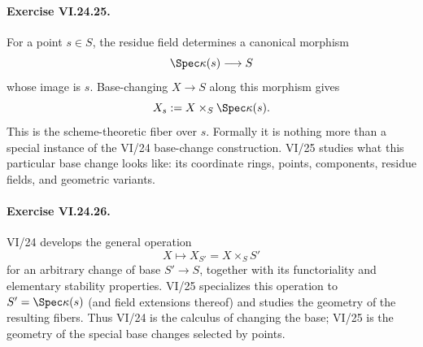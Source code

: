 \paragraph{Exercise VI.24.25.}
\begin{solution}
For a point $s\in S$, the residue field determines a canonical morphism
\[
\Spec\kappa(s)\longrightarrow S
\]
whose image is $s$.  Base-changing $X\to S$ along this morphism gives
\[
X_s:=X\times_S\Spec\kappa(s).
\]
This is the scheme-theoretic fiber over $s$.  Formally it is nothing more than a special instance
of the VI/24 base-change construction.  VI/25 studies what this particular base change looks like:
its coordinate rings, points, components, residue fields, and geometric variants.
\end{solution}

\paragraph{Exercise VI.24.26.}
\begin{solution}
VI/24 develops the general operation
\[
X\longmapsto X_{S'}=X\times_SS'
\]
for an arbitrary change of base $S'\to S$, together with its functoriality and elementary
stability properties.  VI/25 specializes this operation to $S'=\Spec\kappa(s)$ (and field
extensions thereof) and studies the geometry of the resulting fibers.  Thus VI/24 is the calculus
of changing the base; VI/25 is the geometry of the special base changes selected by points.
\end{solution}
